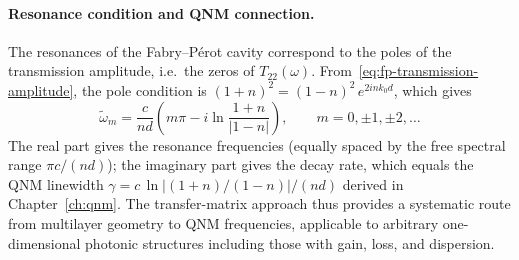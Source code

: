 \paragraph{Resonance condition and QNM connection.}
The resonances of the Fabry--P\'erot cavity correspond to the poles of
the transmission amplitude, i.e.\ the zeros of $T_{22}(\omega)$.
From~\eqref{eq:fp-transmission-amplitude}, the pole condition is
$(1+n)^2 = (1-n)^2\,e^{2ink_0 d}$, which gives
\begin{equation}
 \tilde{\omega}_m = \frac{c}{nd}\left(m\pi - i\ln\frac{1+n}{|1-n|}\right),
 \qquad m = 0, \pm 1, \pm 2, \ldots
 \label{eq:fp-poles-transfer}
\end{equation}
The real part gives the resonance frequencies (equally spaced by the
free spectral range $\pi c/(nd)$); the imaginary part gives the decay
rate, which equals the QNM linewidth $\gamma = c\,\ln|(1+n)/(1-n)|/(nd)$
derived in Chapter~\ref{ch:qnm}. The transfer-matrix approach thus
provides a systematic route from multilayer geometry to QNM frequencies,
applicable to arbitrary one-dimensional photonic structures including
those with gain, loss, and dispersion.
